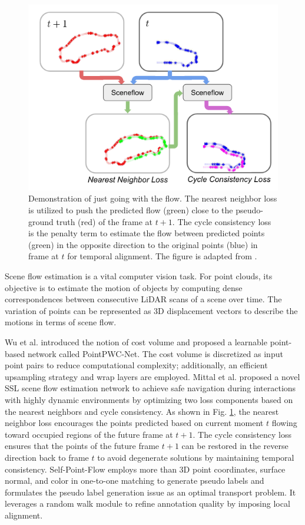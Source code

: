 \documentclass[a4paper,fleqn]{cas-dc}
\begin{document}
\begin{figure}[htbp]
    \centering
    \includegraphics[width=0.97\linewidth]{just_go.png}
    \caption{Demonstration of just going with the flow. The nearest neighbor loss is utilized to push the predicted flow (green) close to the pseudo-ground truth (red) of the frame at $t+1$. The cycle consistency loss is the penalty term to estimate the flow between predicted points (green) in the opposite direction to the original points (blue) in frame at $t$ for temporal alignment. The figure is adapted from \citep{mittal2020just}.}  
    \label{fig:just_go}
\end{figure}

Scene flow estimation is a vital computer vision task. For point clouds, its objective is to estimate the motion of objects by computing dense correspondences between consecutive LiDAR scans of a scene over time. The variation of points can be represented as 3D displacement vectors to describe the motions in terms of scene flow.

Wu et al. \citep{wu2020pointpwc} introduced the notion of cost volume and proposed a learnable point-based network called PointPWC-Net. The cost volume is discretized as input point pairs to reduce computational complexity; additionally, an efficient upsampling strategy and wrap layers are employed. Mittal et al. \citep{mittal2020just} proposed a novel SSL scene flow estimation network to achieve safe navigation during interactions with highly dynamic environments by optimizing two loss components based on the nearest neighbors and cycle consistency. As shown in Fig. \ref{fig:just_go}, the nearest neighbor loss encourages the points predicted based on current moment $t$ flowing toward occupied regions of the future frame at $t+1$. The cycle consistency loss ensures that the points of the future frame $t+1$ can be restored in the reverse direction back to frame $t$ to avoid degenerate solutions by maintaining temporal consistency. Self-Point-Flow \citep{li2021self} employs more than 3D point coordinates, surface normal, and color in one-to-one matching to generate pseudo labels and formulates the pseudo label generation issue as an optimal transport problem. It leverages a random walk module to refine annotation quality by imposing local alignment.
\end{document}
